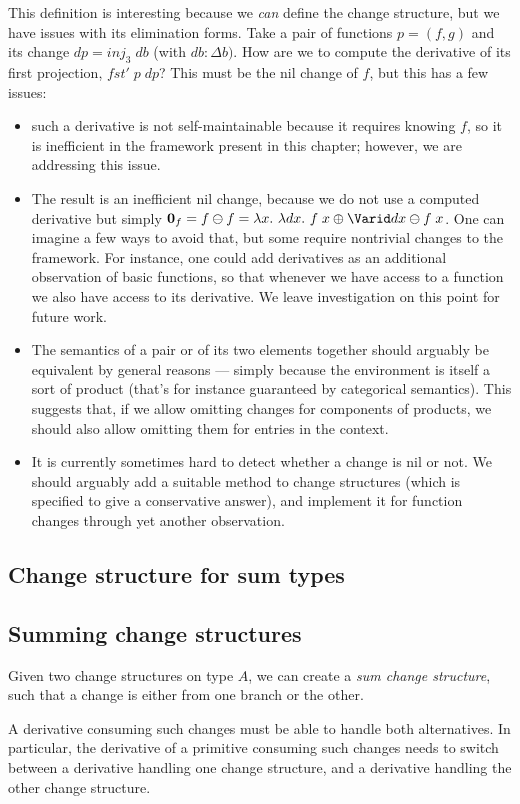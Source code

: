 This definition is interesting because we \emph{can} define the
change structure, but we have issues with its elimination forms.
Take a pair of functions $p = (f, g)$ and its change
$dp = \mathit{inj}_3\; db$ (with $db : \Delta b)$. How are we to
compute the derivative of its first projection, $\mathit{fst'} \;p\; dp$? This
must be the nil change of $f$, but this has a few issues:
\begin{itemize}
\item such a derivative is not self-maintainable because it
  requires knowing $f$, so it is inefficient in the framework
  present in this chapter; however, we are addressing this issue.
\item The result is an inefficient nil change, because we do not
  use a computed derivative but simply
  $\NilC{f} = \Diff{f}{f} = \Lam{x}{\Lam{dx}{\Diff{\App{f}{\Update
          x {\D{x}}}}{\App{f}{x}}}}$. One can imagine a few ways
  to avoid that, but some require nontrivial changes to the
  framework. For instance, one could add derivatives as an
  additional observation of basic functions, so that whenever we
  have access to a function we also have access to its
  derivative. We leave investigation on this point for future
  work.
\item The semantics of a pair or of its two elements together
  should arguably be equivalent by general reasons --- simply
  because the environment is itself a sort of product (that's for
  instance guaranteed by categorical semantics). This suggests
  that, if we allow omitting changes for components of products,
  we should also allow omitting them for entries in the context.
\item It is currently sometimes hard to detect whether a change
  is nil or not. We should arguably add a suitable method to
  change structures (which is specified to give a conservative
  answer), and implement it for function changes through yet
  another observation.
\end{itemize}

\subsection{Change structure for sum types}

\subsection{Summing change structures}
Given two change structures on type $A$, we can create a
\emph{sum change structure}, such that a change is either from
one branch or the other.

A derivative consuming such changes must be able to handle both
alternatives. In particular, the derivative of a primitive
consuming such changes needs to switch between a derivative
handling one change structure, and a derivative handling the
other change structure.%
